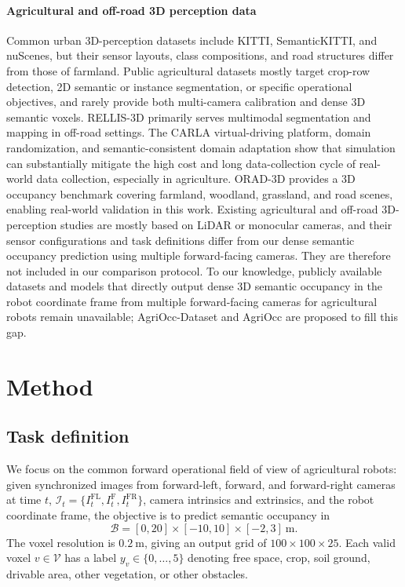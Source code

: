 \documentclass[a4paper,fleqn]{cas-sc}
\newcommand{\I}{\mathcal{I}}
\newcommand{\B}{\mathcal{B}}
\newcommand{\V}{\mathcal{V}}
\begin{document}
\paragraph{Agricultural and off-road 3D perception data}
Common urban 3D-perception datasets include KITTI\citep{geiger2012kitti}, SemanticKITTI\citep{behley2019semantickitti}, and nuScenes\citep{caesar2020nuscenes}, but their sensor layouts, class compositions, and road structures differ from those of farmland. Public agricultural datasets mostly target crop-row detection, 2D semantic or instance segmentation, or specific operational objectives, and rarely provide both multi-camera calibration and dense 3D semantic voxels. RELLIS-3D\citep{jiang2020rellis} primarily serves multimodal segmentation and mapping in off-road settings. The CARLA virtual-driving platform\citep{dosovitskiy2017carla}, domain randomization\citep{tobin2017domainrandomization,peng2018sim2real}, and semantic-consistent domain adaptation\citep{hoffman2018cycada} show that simulation can substantially mitigate the high cost and long data-collection cycle of real-world data collection, especially in agriculture. ORAD-3D provides a 3D occupancy benchmark covering farmland, woodland, grassland, and road scenes\citep{chen2025orad3d}, enabling real-world validation in this work. Existing agricultural and off-road 3D-perception studies are mostly based on LiDAR or monocular cameras, and their sensor configurations and task definitions differ from our dense semantic occupancy prediction using multiple forward-facing cameras. They are therefore not included in our comparison protocol. To our knowledge, publicly available datasets and models that directly output dense 3D semantic occupancy in the robot coordinate frame from multiple forward-facing cameras for agricultural robots remain unavailable; AgriOcc-Dataset and AgriOcc are proposed to fill this gap.

\section{Method}\label{sec:method}
\subsection{Task definition}\label{sec:task}
We focus on the common forward operational field of view of agricultural robots: given synchronized images from forward-left, forward, and forward-right cameras at time $t$, $\I_t=\{I_t^{\mathrm{FL}},I_t^{\mathrm{F}},I_t^{\mathrm{FR}}\}$, camera intrinsics and extrinsics, and the robot coordinate frame, the objective is to predict semantic occupancy in
\begin{equation}
\B=[0,20]\times[-10,10]\times[-2,3]~\mathrm{m}.
\end{equation}
The voxel resolution is $0.2~\mathrm{m}$, giving an output grid of $100\times100\times25$. Each valid voxel $v\in\V$ has a label $y_v\in\{0,\ldots,5\}$ denoting free space, crop, soil ground, drivable area, other vegetation, or other obstacles.
\end{document}
